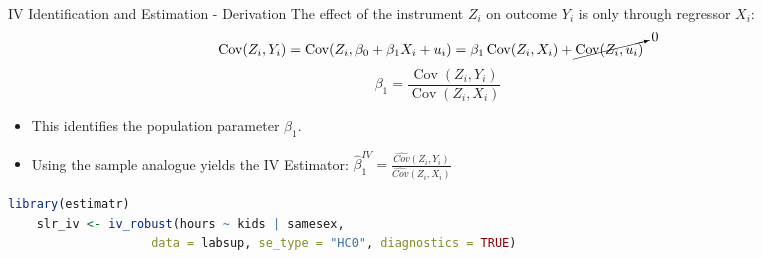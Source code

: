 \documentclass[9pt,aspectratio=169, xcolor=dvipsnames]{beamer}
\begin{document}
\begin{frame}[fragile]{IV Identification and Estimation - Derivation}
The effect of the instrument $Z_i$ on outcome $Y_i$ is only through regressor $X_i$:
\begin{align*}
\operatorname{Cov}(Z_i, Y_i)
    &= \operatorname{Cov}(Z_i, \beta_0 + \beta_1 X_i + u_i) = \beta_1 \operatorname{Cov}(Z_i, X_i)
       + \cancelto{0}{\operatorname{Cov}(Z_i, u_i)} 
\end{align*}
\[\beta_1 = \frac{\operatorname{Cov}(Z_i, Y_i)}{\operatorname{Cov}(Z_i, X_i)}\]
\pause 
\vspace{-6mm}
\begin{itemize}
    \item This identifies the population parameter $\beta_1$.
    \item Using the sample analogue yields the \alert{IV Estimator}: $\hat{\beta}_1^{IV} = \frac{\widehat{Cov}(Z_i, Y_i)}{\widehat{Cov}(Z_i, X_i)}$
\end{itemize}
\vspace{3mm}
\pause
\begin{lstlisting}[language=R]
    library(estimatr)
    slr_iv <- iv_robust(hours ~ kids | samesex, 
                    data = labsup, se_type = "HC0", diagnostics = TRUE)
\end{lstlisting}
\end{frame}
\end{document}
